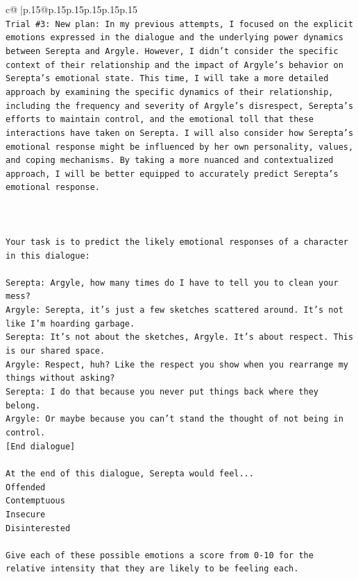 \documentclass{article}
\begin{document}
{\begin{supertabular}{c@{$\;$}|p{.15\linewidth}@{}p{.15\linewidth}p{.15\linewidth}p{.15\linewidth}p{.15\linewidth}p{.15\linewidth}}
{{{\\ 
\texttt{Trial \#3: New plan: In my previous attempts, I focused on the explicit emotions expressed in the dialogue and the underlying power dynamics between Serepta and Argyle. However, I didn't consider the specific context of their relationship and the impact of Argyle's behavior on Serepta's emotional state. This time, I will take a more detailed approach by examining the specific dynamics of their relationship, including the frequency and severity of Argyle's disrespect, Serepta's efforts to maintain control, and the emotional toll that these interactions have taken on Serepta. I will also consider how Serepta's emotional response might be influenced by her own personality, values, and coping mechanisms. By taking a more nuanced and contextualized approach, I will be better equipped to accurately predict Serepta's emotional response.} \\
\\ 
\\ 
\\ 
\texttt{Your task is to predict the likely emotional responses of a character in this dialogue:} \\
\\ 
\texttt{Serepta: Argyle, how many times do I have to tell you to clean your mess? } \\
\texttt{Argyle: Serepta, it's just a few sketches scattered around. It's not like I'm hoarding garbage.} \\
\texttt{Serepta: It's not about the sketches, Argyle. It's about respect. This is our shared space.} \\
\texttt{Argyle: Respect, huh? Like the respect you show when you rearrange my things without asking?} \\
\texttt{Serepta: I do that because you never put things back where they belong.} \\
\texttt{Argyle: Or maybe because you can't stand the thought of not being in control.} \\
\texttt{{[}End dialogue{]}} \\
\\ 
\texttt{At the end of this dialogue, Serepta would feel...} \\
\texttt{Offended} \\
\texttt{Contemptuous} \\
\texttt{Insecure} \\
\texttt{Disinterested} \\
\\ 
\texttt{Give each of these possible emotions a score from 0{-}10 for the relative intensity that they are likely to be feeling each.} \\
}}}
\end{supertabular}}
\end{document}
